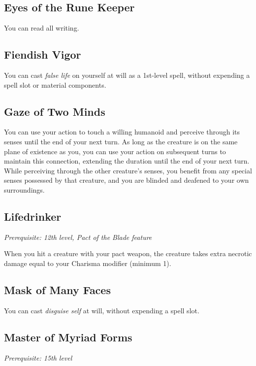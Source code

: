 \subsection{Eyes of the Rune Keeper}

You can read all writing.

\subsection{Fiendish Vigor}

You can cast \textit{false life} on yourself at will as a 1st-level spell, without expending a spell slot or material components.

\subsection{Gaze of Two Minds}

You can use your action to touch a willing humanoid and perceive through its senses until the end of your next turn. As long as the creature is on the same plane of existence as you, you can use your action on subsequent turns to maintain this connection, extending the duration until the end of your next turn. While perceiving through the other creature's senses, you benefit from any special senses possessed by that creature, and you are blinded and deafened to your own surroundings.

\subsection{Lifedrinker}

\textit{Prerequisite: 12th level, Pact of the Blade feature}

When you hit a creature with your pact weapon, the creature takes extra necrotic damage equal to your Charisma modifier (minimum 1).

\subsection{Mask of Many Faces}

You can cast \textit{disguise self} at will, without expending a spell slot.

\subsection{Master of Myriad Forms}

\textit{Prerequisite: 15th level}

